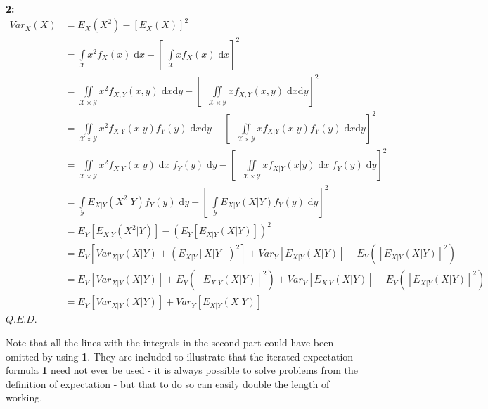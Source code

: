 \documentclass[12pt,a4paper]{article}
\newcommand{\diff}{\mathrm{d}}
\begin{document}
{\bf2: }
\begin{align*}
Var_{X}(X) &= E_{{X}}(X^2) - [E_{X}(X)]^2\\
&= \int\limits_{\mathcal{X}}\!\! x^2 f_X(x)\;\diff x - \left[\;\int\limits_{\mathcal{X}}\!\! x f_X(x)\;\diff x\right]^2\\
&= \iint\limits_{\mathcal{X}\times\mathcal{Y}}\!\! x^2 f_{X,Y}(x,y)\;\diff x \diff y - \left[ \;\;\iint\limits_{\mathcal{X}\times\mathcal{Y}}\!\! x f_{X,Y}(x,y)\;\diff x\diff y\right]^2\\
&= \iint\limits_{\mathcal{X}\times\mathcal{Y}}\!\! x^2 f_{X|Y}(x|y) f_Y(y) \;\diff x\diff y - \left[\;\;\iint\limits_{\mathcal{X}\times\mathcal{Y}}\!\! x f_{X|Y}(x|y) f_Y(y) \;\diff x\diff y\right]^2\\
&= \iint\limits_{\mathcal{X}\times\mathcal{Y}}\!\! x^2 f_{X|Y}(x|y) \;\diff x\; f_Y(y)\;\diff y - \left[\;\;\iint\limits_{\mathcal{X}\times\mathcal{Y}}\!\! x f_{X|Y}(x|y)\;\diff x\; f_Y(y)\;\diff y\right]^2\\
&= \int\limits_{\mathcal{Y}}\!\! E_{{X|Y}}(X^2|Y) f_Y(y)\;\diff y - \left[\;\int\limits_{\mathcal{Y}}\!\! E_{{X|Y}}(X|Y) f_Y(y)\;\diff y\right]^2\\
&= E_{Y}[E_{{X|Y}}(X^2|Y)] - (E_{Y}[E_{{X|Y}}(X|Y)])^2\\
&= E_{Y}[Var_{{X|Y}}(X|Y) + (E_{{X|Y}}[X|Y])^2] + Var_{Y}[E_{{X|Y}}(X|Y)] - E_{Y}([E_{{X|Y}}(X|Y)]^2)\\
&= E_{Y}[Var_{{X|Y}}(X|Y)] + E_{Y}([E_{{X|Y}}(X|Y)]^2) + Var_{Y}[E_{{X|Y}}(X|Y)] - E_{Y}([E_{{X|Y}}(X|Y)]^2)\\
&= E_{Y}[Var_{{X|Y}}(X|Y)] + Var_{Y}[E_{{X|Y}}(X|Y)]
\end{align*}\hfill$Q.E.D.$

Note that all the lines with the integrals in the second part could have been omitted by using {\bf 1}. They are included to illustrate that the iterated expectation formula {\bf 1} need not ever be used - it is always possible to solve problems from the definition of expectation - but that to do so can easily double the length of working.
\end{document}
